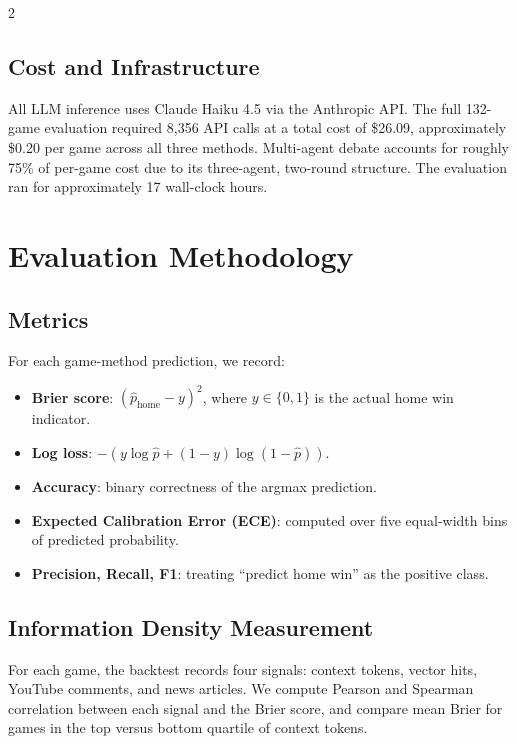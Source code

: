 \documentclass[11pt]{article}
\begin{document}
\begin{multicols}{2}
\subsection{Cost and Infrastructure}

All LLM inference uses Claude Haiku 4.5 via the Anthropic API. The full 132-game evaluation required 8,356 API calls at a total cost of \$26.09, approximately \$0.20 per game across all three methods. Multi-agent debate accounts for roughly 75\% of per-game cost due to its three-agent, two-round structure. The evaluation ran for approximately 17 wall-clock hours.

\section{Evaluation Methodology}

\subsection{Metrics}

For each game-method prediction, we record:

\begin{itemize}[leftmargin=*]
    \item \textbf{Brier score}: $(\hat{p}_{\text{home}} - y)^2$, where $y \in \{0, 1\}$ is the actual home win indicator.
    \item \textbf{Log loss}: $-(y \log \hat{p} + (1-y) \log(1-\hat{p}))$.
    \item \textbf{Accuracy}: binary correctness of the argmax prediction.
    \item \textbf{Expected Calibration Error (ECE)}: computed over five equal-width bins of predicted probability.
    \item \textbf{Precision, Recall, F1}: treating ``predict home win'' as the positive class.
\end{itemize}

\subsection{Information Density Measurement}

For each game, the backtest records four signals: context tokens, vector hits, YouTube comments, and news articles. We compute Pearson and Spearman correlation between each signal and the Brier score, and compare mean Brier for games in the top versus bottom quartile of context tokens.


\end{multicols}
\end{document}

